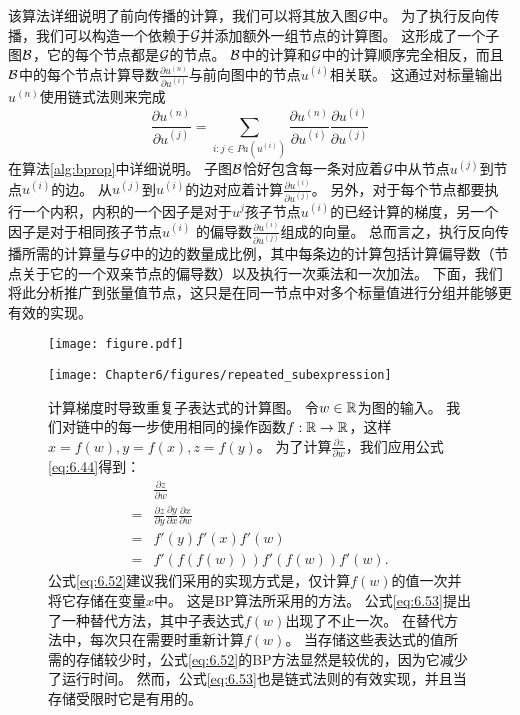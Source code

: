 该算法详细说明了前向传播的计算，我们可以将其放入图$\mathcal{G}$中。
为了执行反向传播，我们可以构造一个依赖于$\mathcal{G}$并添加额外一组节点的计算图。
这形成了一个子图$\mathcal{B}$，它的每个节点都是$\mathcal{G}$的节点。
$\mathcal{B}$中的计算和$\mathcal{G}$中的计算顺序完全相反，而且$\mathcal{B}$中的每个节点计算导数$\frac{\partial u^{(n)}}{\partial u^{(i)}}$与前向图中的节点$u^{(i)}$相关联。
这通过对标量输出$u^{(n)}$使用链式法则来完成
\begin{equation}
  \frac{\partial u^{(n)}}{\partial u^{(j)}} = \sum_{i:j \in Pa(u^{(i)})} \frac{\partial u^{(n)} }{ \partial u^{(i)} } \frac{ \partial u^{(i)} }{ \partial u^{(j)} }
  \label{eq:6.49}
\end{equation}
在算法\ref{alg:bprop}中详细说明。
子图$\mathcal{B}$恰好包含每一条对应着$\mathcal{G}$中从节点$u^{(j)}$到节点$u^{(i)}$的边。
从$u^{(j)}$到$u^{(i)}$的边对应着计算$\frac{\partial u^{(i)}}{\partial u^{(j)}}$。
另外，对于每个节点都要执行一个内积，内积的一个因子是对于$u^{j}$孩子节点$u^{(i)}$的已经计算的梯度，另一个因子是对于相同孩子节点$u^{(i)}$ 的偏导数$\frac{\partial u^{(i)}}{\partial u^{(j)}}$组成的向量。
总而言之，执行反向传播所需的计算量与$\mathcal{G}$中的边的数量成比例，其中每条边的计算包括计算偏导数（节点关于它的一个双亲节点的偏导数）以及执行一次乘法和一次加法。
下面，我们将此分析推广到张量值节点，这只是在同一节点中对多个标量值进行分组并能够更有效的实现。
\begin{figure}[!htb]
\ifOpenSource
\centerline{\texttt{[image: figure.pdf]}}
\else
\centerline{\texttt{[image: Chapter6/figures/repeated\_subexpression]}}
\fi
\captionsetup{singlelinecheck=off}
\caption[.]{
计算梯度时导致重复子表达式的计算图。
令$w \in \mathbb{R}$为图的输入。
我们对链中的每一步使用相同的操作函数$f: \mathbb{R} \to \mathbb{R}$，这样$x=f(w), y=f(x), z=f(y)$。
为了计算$\frac{\partial z}{\partial w}$，我们应用公式\ref{eq:6.44}得到：
\begin{align}
& \frac{\partial z}{\partial w}\\
=& \frac{\partial z}{\partial y} \frac{\partial y}{\partial x} \frac{\partial x}{\partial w}\\
\label{eq:6.52}
=& f'(y)f'(x)f'(w)\\ 
\label{eq:6.53}
=& f'(f(f(w))) f'(f(w)) f'(w). 
\end{align}
公式\ref{eq:6.52}建议我们采用的实现方式是，仅计算$f(w)$的值一次并将它存储在变量$x$中。
这是\gls{BP}算法所采用的方法。
公式\ref{eq:6.53}提出了一种替代方法，其中子表达式$f(w)$出现了不止一次。 %
在替代方法中，每次只在需要时重新计算$f(w)$。
当存储这些表达式的值所需的存储较少时，公式\ref{eq:6.52}的\gls{BP}方法显然是较优的，因为它减少了运行时间。
然而，公式\ref{eq:6.53}也是链式法则的有效实现，并且当存储受限时它是有用的。}
\label{fig:chap6_repeated_subexpression}
\end{figure}

